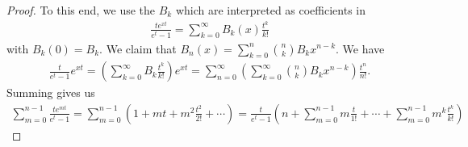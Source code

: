 \begin{proof}
    To this end, we use the  $B_{k}$ which are interpreted as coefficients in
    \begin{align}
        \frac{te^{xt}}{e^{t}-1} = \sum_{k=0}^{\infty} B_{k}(x) \frac{t^{k}}{k!}
    \end{align}
    with $B_{k}(0) = B_{k}$. We claim that $B_{n}(x) = \sum_{k=0}^{n} \binom{n}{k} B_{k} x^{n-k}$. We have
    \begin{align}
        \frac{t}{e^{t}-1} e^{xt} = \left( \sum_{k=0}^{\infty} B_{k} \frac{t^{k}}{k!} \right)e^{xt} = \sum_{n=0}^{\infty} \left( \sum_{k=0}^{\infty} \binom{n}{k} B_{k} x^{n-k} \right) \frac{t^{n}}{n!}.
    \end{align}
    Summing gives us
    \begin{align}
        \sum_{m=0}^{n-1} \frac{te^{mt}}{e^{t}-1} = \sum_{m=0}^{n-1} (1+mt+m^{2}\frac{t^{2}}{2!}+\cdots) = \frac{t}{e^{t}-1}\left( n + \sum_{m=0}^{n-1} m \frac{t}{1!} + \cdots + \sum_{m=0}^{n-1} m^{k} \frac{t^{k}}{k!} \right)
    \end{align}

\end{proof}